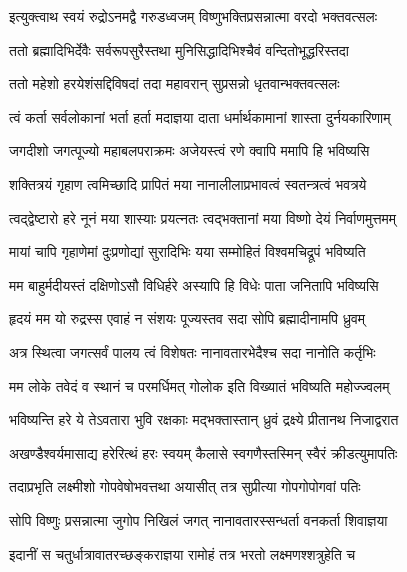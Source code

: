 
\twolineshloka
{इत्युक्त्वाथ स्वयं रुद्रोऽनमद्वै गरुडध्वजम्}
{विष्णुभक्तिप्रसन्नात्मा वरदो भक्तवत्सलः} %

\twolineshloka
{ततो ब्रह्मादिभिर्देवैः सर्वरूपसुरैस्तथा}
{मुनिसिद्धादिभिश्चैवं वन्दितोभूद्धरिस्तदा} %

\twolineshloka
{ततो महेशो हरयेशंसद्दिविषदां तदा}
{महावरान् सुप्रसन्नो धृतवान्भक्तवत्सलः} %


\twolineshloka
{त्वं कर्ता सर्वलोकानां भर्ता हर्ता मदाज्ञया}
{दाता धर्मार्थकामानां शास्ता दुर्नयकारिणाम्} %

\twolineshloka
{जगदीशो जगत्पूज्यो महाबलपराक्रमः}
{अजेयस्त्वं रणे क्वापि ममापि हि भविष्यसि} %

\twolineshloka
{शक्तित्रयं गृहाण त्वमिच्छादि प्रापितं मया}
{नानालीलाप्रभावत्वं स्वतन्त्रत्वं भवत्रये} %

\twolineshloka
{त्वद्द्वेष्टारो हरे नूनं मया शास्याः प्रयत्नतः}
{त्वद्भक्तानां मया विष्णो देयं निर्वाणमुत्तमम्} %

\twolineshloka
{मायां चापि गृहाणेमां दुःप्रणोद्यां सुरादिभिः}
{यया सम्मोहितं विश्वमचिद्रूपं भविष्यति} %

\twolineshloka
{मम बाहुर्मदीयस्तं दक्षिणोऽसौ विधिर्हरे}
{अस्यापि हि विधेः पाता जनितापि भविष्यसि} %

\twolineshloka
{हृदयं मम यो रुद्रस्स एवाहं न संशयः}
{पूज्यस्तव सदा सोपि ब्रह्मादीनामपि ध्रुवम्} %

\twolineshloka
{अत्र स्थित्वा जगत्सर्वं पालय त्वं विशेषतः}
{नानावतारभेदैश्च सदा नानोति कर्तृभिः} %

\twolineshloka
{मम लोके तवेदं व स्थानं च परमर्धिमत्}
{गोलोक इति विख्यातं भविष्यति महोज्ज्वलम्} %

\twolineshloka
{भविष्यन्ति हरे ये तेऽवतारा भुवि रक्षकाः}
{मद्भक्तास्तान् ध्रुवं द्रक्ष्ये प्रीतानथ निजाद्वरात} %


\twolineshloka
{अखण्डैश्वर्यमासाद्य हरेरित्थं हरः स्वयम्}
{कैलासे स्वगणैस्तस्मिन् स्वैरं क्रीडत्युमापतिः} %

\twolineshloka
{तदाप्रभृति लक्ष्मीशो गोपवेषोभवत्तथा}
{अयासीत् तत्र सुप्रीत्या गोपगोपोगवां पतिः} %

\twolineshloka
{सोपि विष्णुः प्रसन्नात्मा जुगोप निखिलं जगत्}
{नानावतारस्सन्धर्ता वनकर्ता शिवाज्ञया} %

\twolineshloka
{इदानीं स चतुर्धात्रावातरच्छङ्कराज्ञया}
{रामोहं तत्र भरतो लक्ष्मणश्शत्रुहेति च} %

